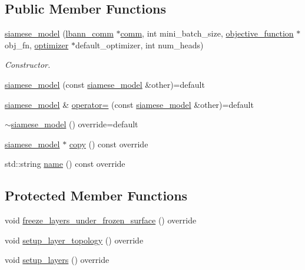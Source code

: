 \subsection*{Public Member Functions}
\begin{DoxyCompactItemize}
\item 
\hyperlink{classlbann_1_1siamese__model_af8ca6d6da679f39489f0c50b62ad0069}{siamese\+\_\+model} (\hyperlink{classlbann_1_1lbann__comm}{lbann\+\_\+comm} $\ast$\hyperlink{file__io_8cpp_ab048c6f9fcbcfaa57ce68b00263dbebe}{comm}, int mini\+\_\+batch\+\_\+size, \hyperlink{classlbann_1_1objective__function}{objective\+\_\+function} $\ast$obj\+\_\+fn, \hyperlink{classlbann_1_1optimizer}{optimizer} $\ast$default\+\_\+optimizer, int num\+\_\+heads)
\begin{DoxyCompactList}\small\item\em Constructor. \end{DoxyCompactList}\item 
\hyperlink{classlbann_1_1siamese__model_a7222db907cdbb05a77f8af9cdf3fd2bc}{siamese\+\_\+model} (const \hyperlink{classlbann_1_1siamese__model}{siamese\+\_\+model} \&other)=default
\item 
\hyperlink{classlbann_1_1siamese__model}{siamese\+\_\+model} \& \hyperlink{classlbann_1_1siamese__model_a7651735d313d7625da89b290cb8e59ee}{operator=} (const \hyperlink{classlbann_1_1siamese__model}{siamese\+\_\+model} \&other)=default
\item 
\hyperlink{classlbann_1_1siamese__model_acf88f0dca9386f33311947fe0569c547}{$\sim$siamese\+\_\+model} () override=default
\item 
\hyperlink{classlbann_1_1siamese__model}{siamese\+\_\+model} $\ast$ \hyperlink{classlbann_1_1siamese__model_a26bbedec5306e47e214124cca2cb381b}{copy} () const override
\item 
std\+::string \hyperlink{classlbann_1_1siamese__model_ad745961977aa395e11543d263103126e}{name} () const override
\end{DoxyCompactItemize}
\subsection*{Protected Member Functions}
\begin{DoxyCompactItemize}
\item 
void \hyperlink{classlbann_1_1siamese__model_a3960a32fd45059516f3acb41549e1e92}{freeze\+\_\+layers\+\_\+under\+\_\+frozen\+\_\+surface} () override
\item 
void \hyperlink{classlbann_1_1siamese__model_a7ff41cffb060500605124959f1a2a6cf}{setup\+\_\+layer\+\_\+topology} () override
\item 
void \hyperlink{classlbann_1_1siamese__model_afefdbaf473d40e571b2b58539001c9c0}{setup\+\_\+layers} () override
\end{DoxyCompactItemize}
